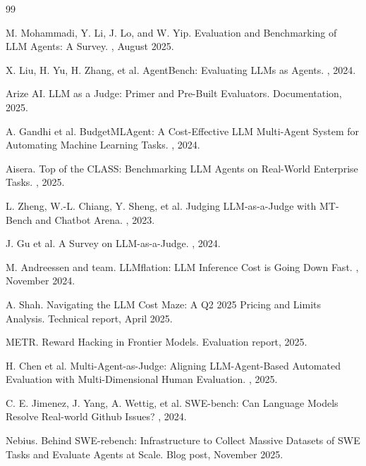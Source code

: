 \begin{thebibliography}{99}

M. Mohammadi, Y. Li, J. Lo, and W. Yip.
\newblock Evaluation and Benchmarking of LLM Agents: A Survey.
, August 2025.

X. Liu, H. Yu, H. Zhang, et al.
\newblock AgentBench: Evaluating LLMs as Agents.
, 2024.

Arize AI.
\newblock LLM as a Judge: Primer and Pre-Built Evaluators.
\newblock Documentation, 2025.

A. Gandhi et al.
\newblock BudgetMLAgent: A Cost-Effective LLM Multi-Agent System for Automating Machine Learning Tasks.
, 2024.

Aisera.
\newblock Top of the CLASS: Benchmarking LLM Agents on Real-World Enterprise Tasks.
, 2025.

L. Zheng, W.-L. Chiang, Y. Sheng, et al.
\newblock Judging LLM-as-a-Judge with MT-Bench and Chatbot Arena.
, 2023.

J. Gu et al.
\newblock A Survey on LLM-as-a-Judge.
, 2024.

M. Andreessen and team.
\newblock LLMflation: LLM Inference Cost is Going Down Fast.
, November 2024.

A. Shah.
\newblock Navigating the LLM Cost Maze: A Q2 2025 Pricing and Limits Analysis.
\newblock Technical report, April 2025.

METR.
\newblock Reward Hacking in Frontier Models.
\newblock Evaluation report, 2025.

H. Chen et al.
\newblock Multi-Agent-as-Judge: Aligning LLM-Agent-Based Automated Evaluation with Multi-Dimensional Human Evaluation.
, 2025.

C. E. Jimenez, J. Yang, A. Wettig, et al.
\newblock SWE-bench: Can Language Models Resolve Real-world Github Issues?
, 2024.

Nebius.
\newblock Behind SWE-rebench: Infrastructure to Collect Massive Datasets of SWE Tasks and Evaluate Agents at Scale.
\newblock Blog post, November 2025.


\end{thebibliography}
